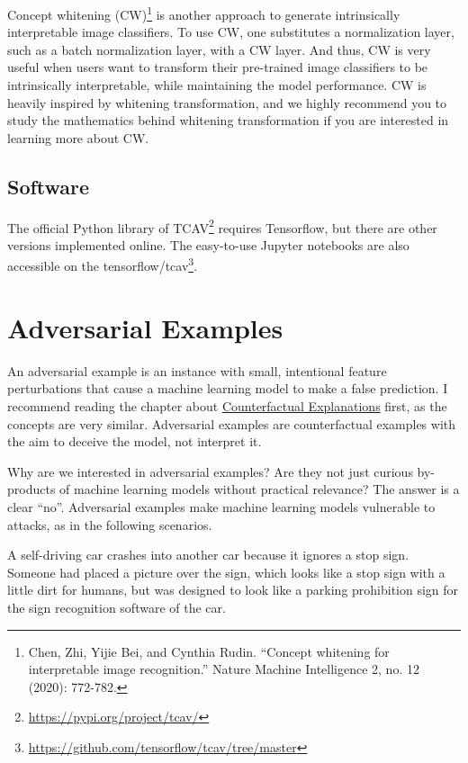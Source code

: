 \documentclass[
  10pt,
]{scrbook}
\renewcommand{\href}[2]{#2\footnote{\url{#1}}}
\begin{document}
Concept whitening (CW)\footnote{Chen, Zhi, Yijie Bei, and Cynthia Rudin. ``Concept whitening for interpretable image recognition.'' Nature Machine Intelligence 2, no. 12 (2020): 772-782.} is another approach to generate intrinsically interpretable image classifiers.
To use CW, one substitutes a normalization layer, such as a batch normalization layer, with a CW layer.
And thus, CW is very useful when users want to transform their pre-trained image classifiers to be intrinsically interpretable, while maintaining the model performance.
CW is heavily inspired by whitening transformation, and we highly recommend you to study the mathematics behind whitening transformation if you are interested in learning more about CW.

\hypertarget{software-7}{%
\subsection{Software}\label{software-7}}

The official Python library of \href{https://pypi.org/project/tcav/}{TCAV} requires Tensorflow, but there are other versions implemented online.
The easy-to-use Jupyter notebooks are also accessible on the \href{https://github.com/tensorflow/tcav/tree/master}{tensorflow/tcav}.

\newpage

\hypertarget{adversarial}{%
\section{Adversarial Examples}\label{adversarial}}

An adversarial example is an instance with small, intentional feature perturbations that cause a machine learning model to make a false prediction.
I recommend reading the chapter about \protect\hyperlink{counterfactual}{Counterfactual Explanations} first, as the concepts are very similar.
Adversarial examples are counterfactual examples with the aim to deceive the model, not interpret it.

Why are we interested in adversarial examples?
Are they not just curious by-products of machine learning models without practical relevance?
The answer is a clear ``no''.
Adversarial examples make machine learning models vulnerable to attacks, as in the following scenarios.

A self-driving car crashes into another car because it ignores a stop sign.
Someone had placed a picture over the sign, which looks like a stop sign with a little dirt for humans, but was designed to look like a parking prohibition sign for the sign recognition software of the car.
\end{document}
